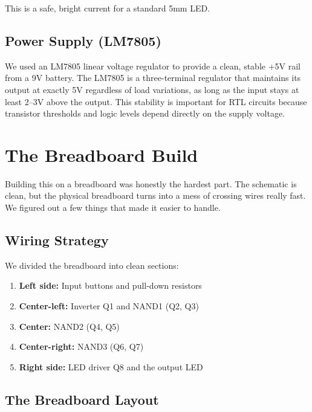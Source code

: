 \documentclass[11pt,a4paper]{article}
\begin{document}
This is a safe, bright current for a standard 5mm LED.

\subsection{Power Supply (LM7805)}

We used an LM7805 linear voltage regulator to provide a clean, stable +5V rail from a 9V battery. The LM7805 is a three-terminal regulator that maintains its output at exactly 5V regardless of load variations, as long as the input stays at least 2--3V above the output. This stability is important for RTL circuits because transistor thresholds and logic levels depend directly on the supply voltage.

\newpage

\section{The Breadboard Build}

Building this on a breadboard was honestly the hardest part. The schematic is clean, but the physical breadboard turns into a mess of crossing wires really fast. We figured out a few things that made it easier to handle.

\subsection{Wiring Strategy}

We divided the breadboard into clean sections:

\begin{enumerate}[leftmargin=2em]
  \item \textbf{Left side:} Input buttons and pull-down resistors
  \item \textbf{Center-left:} Inverter Q1 and NAND1 (Q2, Q3)
  \item \textbf{Center:} NAND2 (Q4, Q5)
  \item \textbf{Center-right:} NAND3 (Q6, Q7)
  \item \textbf{Right side:} LED driver Q8 and the output LED
\end{enumerate}
\subsection{The Breadboard Layout}
\end{document}

